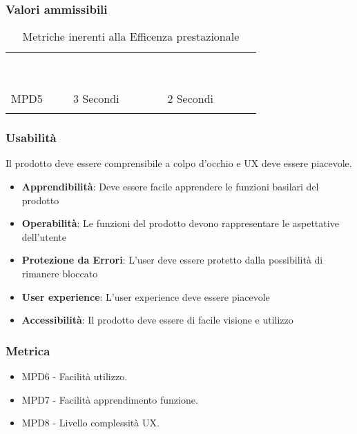 \subsubsection{Valori ammissibili}
\renewcommand{\arraystretch}{1.5}
\begin{longtable}{p{0.12\linewidth}p{0.30\linewidth}p{0.30\linewidth}}
	\rowcolor[RGB]{33, 73, 50}
	\textcolor{white}{\textbf{Metrica}} & \textcolor{white}{\textbf{Valore accettabile}} & \textcolor{white}{\textbf{Valore ottimale}}\\
        \rowcolor[RGB]{216, 235, 171}
    MPD5 & 3 Secondi & 2 Secondi\\ 
    \caption{Metriche inerenti alla Efficenza prestazionale}
\end{longtable}	
\subsubsection{Usabilità}
Il prodotto deve essere comprensibile a colpo d'occhio e UX deve essere piacevole.
\begin{itemize}
    \item \textbf{Apprendibilità}: Deve essere facile apprendere le funzioni basilari del prodotto
    \item \textbf{Operabilità}: Le funzioni del prodotto devono rappresentare le aspettative dell'utente
    \item \textbf{Protezione da Errori}: L'user deve essere protetto dalla possibilità di rimanere bloccato
    \item \textbf{User experience}: L'user experience deve essere piacevole
    \item \textbf{Accessibilità}: Il prodotto deve essere di facile visione e utilizzo
\end{itemize}  
\subsubsection{Metrica}
\begin{itemize}
    \item MPD6 - Facilità utilizzo.
    \item MPD7 - Facilità apprendimento funzione.
    \item MPD8 - Livello complessità UX. %
\end{itemize}
